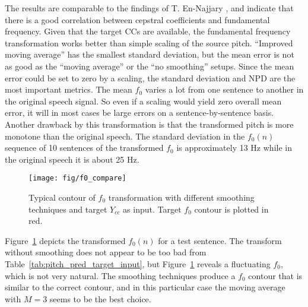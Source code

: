 The results are comparable to the findings of T. En-Najjary \etal \cite{najjary03new}, and indicate that there is a good correlation between cepstral coefficients and fundamental frequency. Given that the target CCs are available, the fundamental frequency transformation works better than simple scaling of the source pitch. ``Improved moving average'' has the smallest standard deviation, but the mean error is not as good as the ``moving average'' or the ``no smoothing'' setups. Since the mean error could be set to zero by a scaling, the standard deviation and NPD are the most important metrics. The mean $f_0$ varies a lot from one sentence to another in the original speech signal. So even if a scaling would yield zero overall mean error, it will in most cases be large errors on a sentence-by-sentence basis. Another drawback by this transformation is that the transformed pitch is more monotone than the original speech. The standard deviation in the $f_0(n)$ sequence of 10 sentences of the transformed $f_0$ is approximately 13 Hz while in the original speech it is about 25 Hz.

\begin{figure}[htbp]
	\begin{center}
		\texttt{[image: fig/f0\_compare]}
		\caption{Typical contour of $f_0$ transformation with different smoothing techniques and target $Y_{cc}$ as input. Target $f_0$ contour is plotted in red.}
		\label{fig:pitch_trans}
	\end{center}
\end{figure}
Figure~\ref{fig:pitch_trans} depicts the transformed $f_0(n)$ for a test sentence. The transform without smoothing does not appear to be too bad from Table~\ref{tab:pitch_pred_target_input}, but Figure~\ref{fig:pitch_trans} reveals a fluctuating $f_0$, which is not very natural. The smoothing techniques produce a $f_0$ contour that is similar to the correct contour, and in this particular case the moving average with $M=3$ seems to be the best choice.

